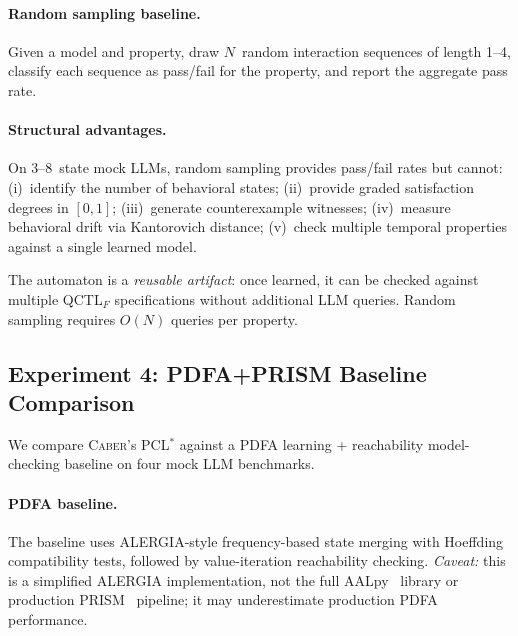 \documentclass[11pt]{article}
\newcommand{\tool}{\textsc{Caber}}
\newcommand{\pclstar}{PCL$^*$}
\newcommand{\qctlf}{QCTL$_F$}
\begin{document}
\paragraph{Random sampling baseline.}
Given a model and property, draw $N$~random interaction sequences
of length 1--4, classify each sequence as pass/fail for the
property, and report the aggregate pass rate.

\paragraph{Structural advantages.}
On 3--8~state mock LLMs, random sampling provides pass/fail rates
but cannot:
(i)~identify the number of behavioral states;
(ii)~provide graded satisfaction degrees in $[0,1]$;
(iii)~generate counterexample witnesses;
(iv)~measure behavioral drift via Kantorovich distance;
(v)~check multiple temporal properties against a single learned model.

The automaton is a \emph{reusable artifact}: once learned, it can be
checked against multiple \qctlf{} specifications without additional
LLM queries.  Random sampling requires $O(N)$ queries per property.

\subsection{Experiment 4: PDFA+PRISM Baseline Comparison}\label{sec:pdfa-baseline}

We compare \tool{}'s \pclstar{} against a PDFA learning + reachability
model-checking baseline on four mock LLM benchmarks.

\paragraph{PDFA baseline.}
The baseline uses ALERGIA-style frequency-based state merging with
Hoeffding compatibility tests, followed by value-iteration reachability
checking.  \emph{Caveat:} this is a simplified ALERGIA implementation,
not the full AALpy~\cite{muskardin2022aalpy} library or production
PRISM~\cite{kwiatkowska2011prism} pipeline; it may underestimate
production PDFA performance.
\end{document}
